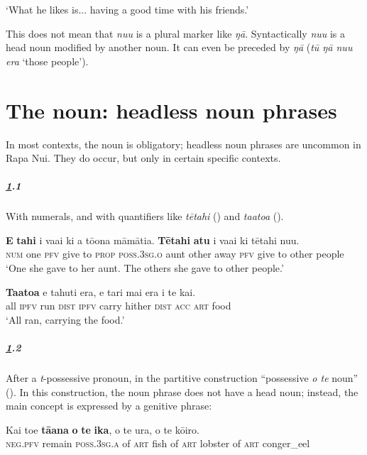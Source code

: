 \glt
‘What he likes is... having a good time with his friends.’ \textstyleExampleref{[R489.003]} 
\z

This does not mean that \textit{nu{\ꞌ}u} is a plural marker like \textit{ŋā}. Syntactically \textit{nu{\ꞌ}u} is a head noun modified by another noun. It can even be preceded by \textit{ŋā} (\textit{tū ŋā \mbox{nu{\ꞌ}u} era} ‘those people’).
\section{The noun: headless noun phrases}\label{sec:5.6}
In most contexts, the noun is obligatory; headless noun phrases are uncommon in Rapa Nui. They do occur, but only in certain specific contexts.

\subparagraph{\ref{sec:5.6}.1} With numerals, and with quantifiers like \textit{tētahi} () and \textit{ta{\ꞌ}ato{\ꞌ}a} ().

\ea\label{ex:5.97}
\gll \textbf{E} \textbf{tahi} i va{\ꞌ}ai ki a tō{\ꞌ}ona māmātia. \textbf{Tētahi} \textbf{atu} i va{\ꞌ}ai  ki tētahi nu{\ꞌ}u.\\
\textsc{num} one \textsc{pfv} give to \textsc{prop} \textsc{poss.3sg.o} aunt other away \textsc{pfv} give  to other people\\

\glt 
‘One she gave to her aunt. The others she gave to other people.’ \textstyleExampleref{[R168.006–007]}
\z

\ea\label{ex:5.98}
\gll \textbf{Ta{\ꞌ}ato{\ꞌ}a} e tahuti era, e tari mai era i te kai. \\
all \textsc{ipfv} run \textsc{dist} \textsc{ipfv} carry hither \textsc{dist} \textsc{acc} \textsc{art} food \\

\glt 
‘All ran, carrying the food.’ \textstyleExampleref{[R210.155]} 
\z

\subparagraph{\ref{sec:5.6}.2} After a \textit{t}{}-possessive pronoun, in the partitive construction “possessive \textit{o te} noun” (). In this construction, the noun phrase does not have a head noun; instead, the main concept is expressed by a genitive phrase:

\ea\label{ex:5.99}
\gll Kai toe \textbf{tā{\ꞌ}ana} \textbf{o} \textbf{te} \textbf{ika}, o te {\ꞌ}ura, o te kō{\ꞌ}iro. \\
\textsc{neg.pfv} remain \textsc{poss.3sg.a} of \textsc{art} fish of \textsc{art} lobster of \textsc{art} conger\_eel \\

